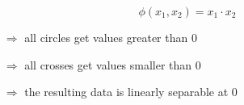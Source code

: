 \[ \phi(x_1, x_2) = x_1 \cdot x_2 \]

\begin{itemize}
\item[$\Rightarrow$]{all circles get values greater than 0}
\item[$\Rightarrow$]{all crosses get values smaller than 0}
\item[$\Rightarrow$]{the resulting data is linearly separable at 0}
\end{itemize}

